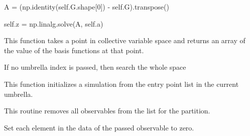 \documentclass[letterpaper,10pt,english]{sphinxmanual}
\begin{document}
\begin{fulllineitems}
\begin{fulllineitems}
A = (np.identity(self.G.shape{[}0{]}) - self.G).transpose()

self.z = np.linalg.solve(A, self.a)

\end{fulllineitems}


\begin{fulllineitems}
\label{applications/applications.doc:partition.partition.get_basis_function_values}
This function takes a point in collective variable space and returns 
an array of the value of the basis functions at that point.

If no umbrella index is passed, then search the whole space

\end{fulllineitems}


\begin{fulllineitems}
\label{applications/applications.doc:partition.partition.reinject}
This function initializes a simulation from the entry point list in the 
current umbrella.

\end{fulllineitems}


\begin{fulllineitems}
\label{applications/applications.doc:partition.partition.removeObservable}
This routine removes all observables from the list for the partition.

\end{fulllineitems}


\begin{fulllineitems}
\label{applications/applications.doc:partition.partition.resetObservable}
Set each element in the data of the passed observable to zero.

\end{fulllineitems}



\end{fulllineitems}
\end{document}
